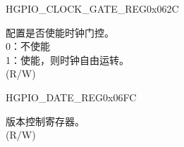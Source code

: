 \begin{register}{H}{GPIO\_CLOCK\_GATE\_REG}{0x062C}\label{regdesc:GPIOCLOCKGATEREG}
%
%
\regnewline%
\begin{regdesc}\begin{reglist}
\label{fielddesc:GPIOCLKEN}\item [GPIO\_CLK\_EN] 配置是否使能时钟门控。\\
0：不使能\\
1：使能，则时钟自由运转。\\(R/W)
\end{reglist}\end{regdesc}
\end{register}


\begin{register}{H}{GPIO\_DATE\_REG}{0x06FC}\label{regdesc:GPIOREGDATEREG}
%
%
\regnewline%
\begin{regdesc}\begin{reglist}
\label{fielddesc:GPIOREGDATE}\item [GPIO\_DATE] 版本控制寄存器。\\ (R/W)
\end{reglist}\end{regdesc}
\end{register}
